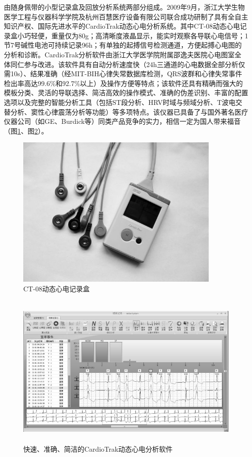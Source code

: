 由随身佩带的小型记录盒及回放分析系统两部分组成。2009年9月，浙江大学生物医学工程与仪器科学学院及杭州百慧医疗设备有限公司联合成功研制了具有全自主知识产权、国际先进水平的CardioTrak动态心电分析系统。其中CT-08动态心电记录盒小巧轻便，重量仅为80g；高清晰度液晶显示，能实时观察各导联心电信号；1节7号碱性电池可持续记录96h；有单独的起搏信号检测通道，方便起搏心电图的分析和诊断。CardioTrak分析软件由浙江大学医学院附属邵逸夫医院心电图室全体同仁参与改进。该软件具有自动分析速度快（24h三通道的心电数据全部分析仅需10s）、结果准确（经MIT-BIH心律失常数据库检测，QRS波群和心律失常事件检出率高达99.6\%和92.7\%以上）及操作方便等特点；该软件还具有精确而强大的模板分类、灵活的导联选择、简洁高效的操作模式、准确的伪差识别、丰富的配置选项以及完整的智能分析工具（包括ST段分析、HRV时域与频域分析、T波电交替分析、窦性心律震荡分析等功能）等多项特点。该仪器已具备了与国外著名医疗仪器公司（如GE、Burdick等）同类产品竞争的实力，相信一定为国人带来福音（图\ref{fig47-6}、图\ref{fig47-7}）。

\begin{figure}[!htbp]
 \centering
 \includegraphics[width=3.98958in,height=2.98958in]{./images/Image00743.jpg}
 \captionsetup{justification=centering}
 \caption{CT-08动态心电记录盒}
 \label{fig47-6}
  \end{figure} 

\begin{figure}[!htbp]
 \centering
 \includegraphics[width=5.1875in,height=3.04167in]{./images/Image00744.jpg}
 \captionsetup{justification=centering}
 \caption{快速、准确、简洁的CardioTrak动态心电分析软件}
 \label{fig47-7}
  \end{figure} 

